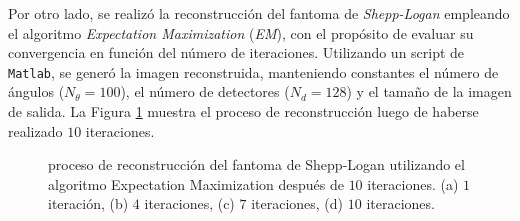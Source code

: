 \documentclass[11pt, twocolumn]{article}
\begin{document}
Por otro lado, se realizó la reconstrucción del fantoma de \textit{Shepp-Logan} empleando el algoritmo \textit{Expectation Maximization} (\textit{EM}), con el propósito de evaluar su convergencia en función del número de iteraciones. Utilizando un script de \texttt{Matlab}, se generó la imagen reconstruida, manteniendo constantes el número de ángulos ($N_\theta = 100$), el número de detectores ($N_d = 128$) y el tamaño de la imagen de salida. La Figura \ref{fig:ej_2_em} muestra el proceso de reconstrucción luego de haberse realizado $10$ iteraciones.


\begin{figure}[htbp]
  \centering
  \hfill
  \hfill
  \hfill
  \hfill
  \caption{proceso de reconstrucción del fantoma de Shepp-Logan utilizando el algoritmo Expectation Maximization después de $10$ iteraciones. (a) $1$ iteración, (b) $4$ iteraciones, (c) $7$ iteraciones, (d) $10$ iteraciones.}
  \label{fig:ej_2_em}
\end{figure}
\end{document}
